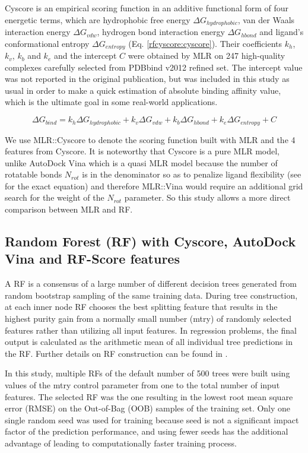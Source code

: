 Cyscore is an empirical scoring function in an additive functional form of four energetic terms, which are hydrophobic free energy $\Delta G_{hydrophobic}$, van der Waals interaction energy $\Delta G_{vdw}$, hydrogen bond interaction energy $\Delta G_{hbond}$ and ligand's conformational entropy $\Delta G_{entropy}$ (Eq. \eqref{rfcyscore:cyscore}). Their coefficients $k_h$, $k_v$, $k_b$ and $k_e$ and the intercept $C$ were obtained by MLR on 247 high-quality complexes carefully selected from PDBbind v2012 refined set. The intercept value was not reported in the original publication, but was included in this study as usual \citep{1313} in order to make a quick estimation of absolute binding affinity value, which is the ultimate goal in some real-world applications.

\begin{equation}
\Delta G_{bind} = k_h\Delta G_{hydrophobic} + k_v\Delta G_{vdw} + k_b\Delta G_{hbond} + k_e\Delta G_{entropy} + C
\label{rfcyscore:cyscore}
\end{equation}

We use MLR::Cyscore to denote the scoring function built with MLR and the 4 features from Cyscore. It is noteworthy that Cyscore is a pure MLR model, unlike AutoDock Vina \citep{595} which is a quasi MLR model because the number of rotatable bonds $N_{rot}$ is in the denominator so as to penalize ligand flexibility (see \citep{1362} for the exact equation) and therefore MLR::Vina would require an additional grid search for the weight of the $N_{rot}$ parameter. So this study allows a more direct comparison between MLR and RF.

\subsection{Random Forest (RF) with Cyscore, AutoDock Vina and RF-Score features}

A RF \citep{1309} is a consensus of a large number of different decision trees generated from random bootstrap sampling of the same training data. During tree construction, at each inner node RF chooses the best splitting feature that results in the highest purity gain from a normally small number (mtry) of randomly selected features rather than utilizing all input features. In regression problems, the final output is calculated as the arithmetic mean of all individual tree predictions in the RF. Further details on RF construction can be found in \citep{564,1362}.

In this study, multiple RFs of the default number of 500 trees were built using values of the mtry control parameter from one to the total number of input features. The selected RF was the one resulting in the lowest root mean square error (RMSE) on the Out-of-Bag (OOB) samples of the training set. Only one single random seed was used for training because seed is not a significant impact factor of the prediction performance, and using fewer seeds has the additional advantage of leading to computationally faster training process.

